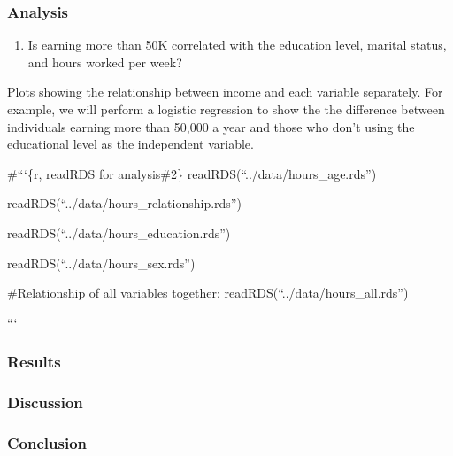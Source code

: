 \documentclass[]{article}
\providecommand{\tightlist}{%
  \setlength{\itemsep}{0pt}\setlength{\parskip}{0pt}}
\begin{document}
\hypertarget{analysis}{%
\subsubsection{Analysis}\label{analysis}}

\begin{enumerate}
\def\labelenumi{\arabic{enumi}.}
\tightlist
\item
  Is earning more than 50K correlated with the education level, marital
  status, and hours worked per week?
\end{enumerate}

Plots showing the relationship between income and each variable
separately. For example, we will perform a logistic regression to show
the the difference between individuals earning more than 50,000 a year
and those who don't using the educational level as the independent
variable.

\#```\{r, readRDS for analysis\#2\} readRDS(``../data/hours\_age.rds'')

readRDS(``../data/hours\_relationship.rds'')

readRDS(``../data/hours\_education.rds'')

readRDS(``../data/hours\_sex.rds'')

\#Relationship of all variables together:
readRDS(``../data/hours\_all.rds'')

```

\hypertarget{results}{%
\subsubsection{Results}\label{results}}

\hypertarget{discussion}{%
\subsubsection{Discussion}\label{discussion}}

\hypertarget{conclusion}{%
\subsubsection{Conclusion}\label{conclusion}}
\end{document}
